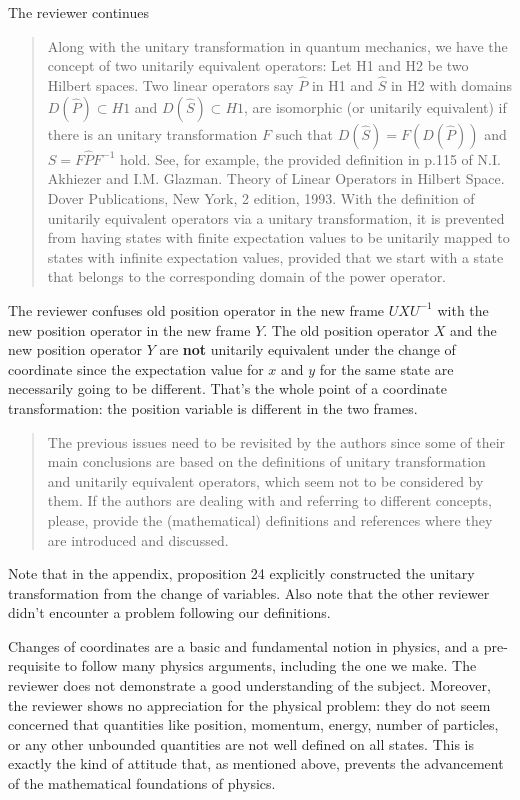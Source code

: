 \documentclass[11pt, executivepaper]{article}
\begin{document}
The reviewer continues
\begin{quote}
Along with the unitary transformation in quantum mechanics, we have the
concept of two unitarily equivalent operators: Let H1 and H2 be two Hilbert
spaces. Two linear operators say $\hat{P}$ in H1 and $\hat{S}$ in H2 with domains $D(\hat{P}) \subset H1$
and $D(\hat{S}) \subset H1$, are isomorphic (or unitarily equivalent) if there is an unitary
transformation $F$ such that $D(\hat{S}) = F(D(\hat{P}))$ and $S = F\hat{P}F^{-1}$ hold. See, for
example, the provided definition in p.115 of N.I. Akhiezer and I.M. Glazman.
Theory of Linear Operators in Hilbert Space. Dover Publications, New York, 2
edition, 1993.
With the definition of unitarily equivalent operators via a unitary transformation,
it is prevented from having states with finite expectation values to
be unitarily mapped to states with infinite expectation values, provided that
we start with a state that belongs to the corresponding domain of the power
operator.
\end{quote}
The reviewer confuses old position operator in the new frame $U X U^{-1}$  with the new position operator in the new frame $Y$. The old position operator $X$ and the new position operator $Y$ are \textbf{not} unitarily equivalent under the change of coordinate since the expectation value for $x$ and $y$ for the same state are necessarily going to be different. That's the whole point of a coordinate transformation: the position variable is different in the two frames.

\begin{quote}
The previous issues need to be revisited by the authors since some of their
main conclusions are based on the definitions of unitary transformation and
unitarily equivalent operators, which seem not to be considered by them. If
the authors are dealing with and referring to different concepts, please, provide
the (mathematical) definitions and references where they are introduced and
discussed.
\end{quote}
Note that in the appendix, proposition 24 explicitly constructed the unitary transformation from the change of variables. Also note that the other reviewer didn't encounter a problem following our definitions.

Changes of coordinates are a basic and fundamental notion in physics, and a pre-requisite to follow many physics arguments, including the one we make. The reviewer does not demonstrate a good understanding of the subject. Moreover, the reviewer shows no appreciation for the physical problem: they do not seem concerned that quantities like position, momentum, energy, number of particles, or any other unbounded quantities are not well defined on all states. This is exactly the kind of attitude that, as mentioned above, prevents the advancement of the mathematical foundations of physics.
\end{document}
